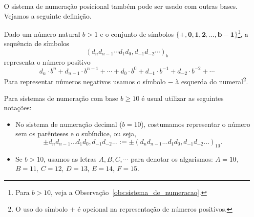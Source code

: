 O sistema de numeração posicional também pode ser usado com outras bases. Vejamos a seguinte definição.

\begin{defn}\label{def:sistema_de_numeracao}
Dado um número natural $b>1$ e o conjunto de símbolos $\{\pmb{\pm},  \pmb{0}, \pmb{1}, \pmb{2},\dotsc, \pmb{b-1}\}$\footnote{Para $b>10$, veja a Observação~\ref{obs:sistema_de_numeracao}.}, a sequência de símbolos
\begin{equation}
  \left(d_nd_{n-1} \cdots d_1d_0,d_{-1}d_{-2} \cdots \right)_b
\end{equation}
representa o número positivo
\begin{equation}
  d_n\cdot b^n + d_{n-1}\cdot b^{n-1} + \cdots + d_0\cdot b^0 + d_{-1}\cdot b^{-1}+d_{-2}\cdot b^{-2} + \cdots
\end{equation}
Para representar números negativos usamos o símbolo $-$ à esquerda do numeral\footnote{O uso do símbolo $+$ é opcional na representação de números positivos.}.
\end{defn}

\begin{obs}[$b\geq 10$]\label{obs:sistema_de_numeracao}
Para sistemas de numeração com base $b \geq 10$ é usual utilizar as seguintes notações:
\begin{itemize}
\item No sistema de numeração decimal ($b=10$), costumamos representar o número sem os parênteses e o subíndice, ou seja,
\begin{equation}
  \pm d_nd_{n-1}\ldots d_1d_0,d_{-1}d_{-2}\ldots := \pm (d_nd_{n-1}\ldots d_1d_0,d_{-1}d_{-2}\ldots)_{10}.
\end{equation}
\item Se $b>10$, usamos as letras $A, B, C, \cdots$ para denotar os algarismos: $A=10$, $B=11$, $C=12$, $D=13$, $E=14$, $F=15$.
\end{itemize}
\end{obs}


